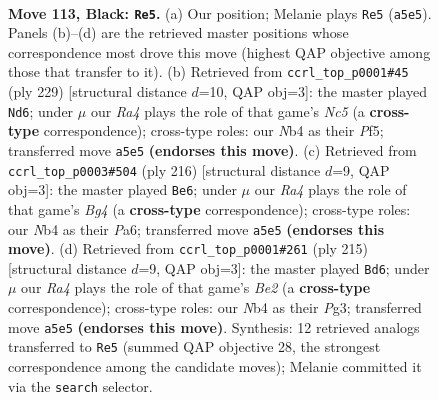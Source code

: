 \documentclass[11pt]{article}
\begin{document}
\clearpage

\begin{figure}[p]\centering
\begin{subfigure}{0.46\textwidth}\centering
\resizebox{\linewidth}{!}{%
\newchessgame
\chessboard[
  setfen={6B1/8/6k1/r5p1/1n6/6K1/8/8 b - - 11 113},
  showmover=false,
  pgfstyle=straightmove, color=movearrow, markmove={a5-e5}
]}
\caption{}
\end{subfigure}\hfill
\begin{subfigure}{0.46\textwidth}\centering
\resizebox{\linewidth}{!}{%
\newchessgame
\chessboard[
  setfen={8/8/8/5pk1/2n2p2/8/5K2/3B4 b - - 41 115},
  showmover=false,
  pgfstyle=straightmove, color=movearrow, markmove={c4-d6}
]}
\caption{}
\end{subfigure}
\\[4pt]
\begin{subfigure}{0.46\textwidth}\centering
\resizebox{\linewidth}{!}{%
\newchessgame
\chessboard[
  setfen={8/4k3/P7/3P4/2K3B1/8/8/6b1 w - - 29 109},
  showmover=false,
  pgfstyle=straightmove, color=movearrow, markmove={g4-e6}
]}
\caption{}
\end{subfigure}\hfill
\begin{subfigure}{0.46\textwidth}\centering
\resizebox{\linewidth}{!}{%
\newchessgame
\chessboard[
  setfen={8/4b3/1k6/2p5/8/1K4p1/6B1/8 b - - 87 108},
  showmover=false,
  pgfstyle=straightmove, color=movearrow, markmove={e7-d6}
]}
\caption{}
\end{subfigure}
\caption{\textbf{Move 113, Black: \texttt{Re5}.} (a) Our position; Melanie plays \texttt{Re5} (\texttt{a5e5}). Panels (b)--(d) are the retrieved master positions whose correspondence most drove this move (highest QAP objective among those that transfer to it). (b) Retrieved from \texttt{ccrl\_top\_p0001\#45} (ply 229) [structural distance $d$=10, QAP obj=3]: the master played \texttt{Nd6}; under $\mu$ our \emph{Ra4} plays the role of that game's \emph{Nc5} (a \textbf{cross-type} correspondence); cross-type roles: our \emph{N}b4 as their \emph{P}f5; transferred move \texttt{a5e5} \textbf{(endorses this move)}. (c) Retrieved from \texttt{ccrl\_top\_p0003\#504} (ply 216) [structural distance $d$=9, QAP obj=3]: the master played \texttt{Be6}; under $\mu$ our \emph{Ra4} plays the role of that game's \emph{Bg4} (a \textbf{cross-type} correspondence); cross-type roles: our \emph{N}b4 as their \emph{P}a6; transferred move \texttt{a5e5} \textbf{(endorses this move)}. (d) Retrieved from \texttt{ccrl\_top\_p0001\#261} (ply 215) [structural distance $d$=9, QAP obj=3]: the master played \texttt{Bd6}; under $\mu$ our \emph{Ra4} plays the role of that game's \emph{Be2} (a \textbf{cross-type} correspondence); cross-type roles: our \emph{N}b4 as their \emph{P}g3; transferred move \texttt{a5e5} \textbf{(endorses this move)}. Synthesis: 12 retrieved analogs transferred to \texttt{Re5} (summed QAP objective 28, the strongest correspondence among the candidate moves); Melanie committed it via the \texttt{search} selector.}
\label{fig:thought-m225}
\end{figure}
\end{document}
